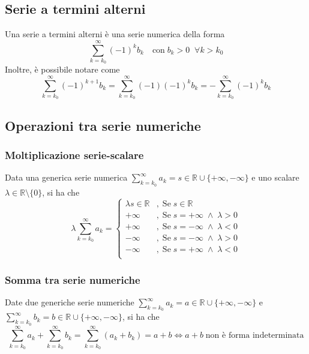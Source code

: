 \documentclass{article}
\begin{document}
        \vspace{10pt}
        \subsection{Serie a termini alterni}
            Una serie a termini alterni è una serie numerica della forma
            \[
                \sum_{k = k_{0}}^{\infty} (-1)^{k} b_{k} \quad \text{con} \; b_{k} > 0 \;\; \forall k > k_{0}
            \]
            Inoltre, è possibile notare come
            \[
                \sum_{k = k_{0}}^{\infty} (-1)^{k + 1} b_{k} = \sum_{k = k_{0}}^{\infty} (-1)(-1)^{k} b_{k} = - \sum_{k = k_{0}}^{\infty} (-1)^{k} b_{k}
            \]



        \vspace{10pt}
        \subsection{Operazioni tra serie numeriche}
            \subsubsection{Moltiplicazione serie-scalare}
                Data una generica serie numerica $\sum_{k = k_{0}}^{\infty} a_{k} = s \in \mathbb{R} \cup \{+\infty, -\infty\}$ e uno scalare $\lambda \in \mathbb{R} \setminus \{0\}$, si ha che
                \[
                    \lambda \sum_{k = k_{0}}^{\infty} a_{k} = 
                    \begin{cases} 
                        \lambda s \in \mathbb{R} &, \; \text{Se} \; s \in \mathbb{R} \\
                        +\infty                  &, \; \text{Se} \; s = +\infty \; \land \; \lambda > 0 \\
                        +\infty                  &, \; \text{Se} \; s = -\infty \; \land \; \lambda < 0 \\
                        -\infty                  &, \; \text{Se} \; s = -\infty \; \land \; \lambda > 0 \\
                        -\infty                  &, \; \text{Se} \; s = +\infty \; \land \; \lambda < 0 \\
                    \end{cases}
                \]
            
            \vspace{10pt}
            \subsubsection{Somma tra serie numeriche}
                Date due generiche serie numeriche $\sum_{k = k_{0}}^{\infty} a_{k} = a \in \mathbb{R} \cup \{+\infty, -\infty\}$ e $\sum_{k = k_{0}}^{\infty} b_{k} = b \in \mathbb{R} \cup \{+\infty, -\infty\}$, si ha che
                \[
                    \sum_{k = k_{0}}^{\infty} a_{k} + \sum_{k = k_{0}}^{\infty} b_{k} = \sum_{k = k_{0}}^{\infty} (a_{k} + b_{k}) = a + b \iff a + b \; \text{non è forma indeterminata}
                \]
        
\end{document}

